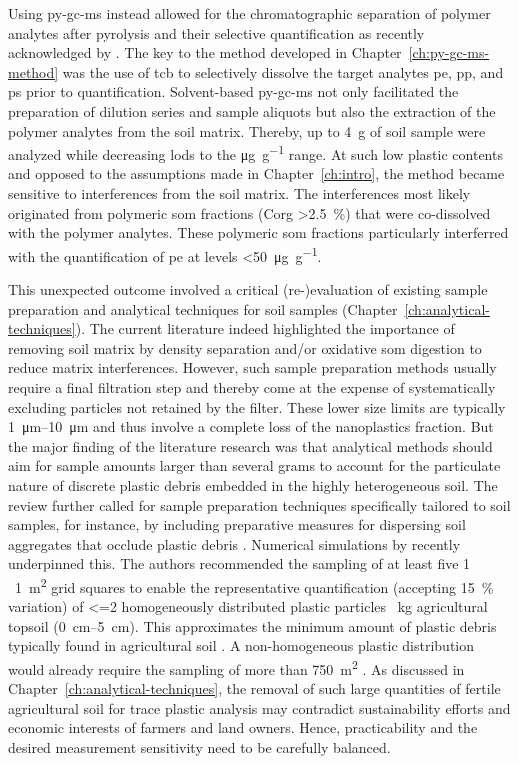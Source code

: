 Using \ac{py-gc-ms} instead allowed for the chromatographic separation of polymer analytes after pyrolysis and their selective quantification as recently acknowledged by \citet{Jimenez-SkrzypekCurrent2021}. The key to the method developed in Chapter~\ref{ch:py-gc-ms-method} was the use of \ac{tcb} to selectively dissolve the target analytes \ac{pe}, \ac{pp}, and \ac{ps} prior to quantification. Solvent-based \ac{py-gc-ms} not only facilitated the preparation of dilution series and sample aliquots but also the extraction of the polymer analytes from the soil matrix. Thereby, up to \SI{4}{\gram} of soil sample were analyzed while decreasing \acp{lod} to the \si{\micro\gram\per\gram} range.
At such low plastic contents and opposed to the assumptions made in Chapter~\ref{ch:intro}, the method became sensitive to interferences from the soil matrix. The interferences most likely originated from polymeric \ac{som} fractions (\ac{Corg} \SI{>2.5}{\percent}) that were co-dissolved with the polymer analytes. These polymeric \ac{som} fractions particularly interferred with the quantification of \ac{pe} at levels \SI{<50}{\micro\gram\per\gram}.

This unexpected outcome involved a critical (re-)evaluation of existing sample preparation and analytical techniques for soil samples (Chapter~\ref{ch:analytical-techniques}). The current literature indeed highlighted the importance of removing soil matrix by density separation and/or oxidative \ac{som} digestion to reduce matrix interferences. However, such sample preparation methods usually require a final filtration step and thereby come at the expense of systematically excluding particles not retained by the filter. These lower size limits are typically \SIrange{1}{10}{\micro\meter} and thus involve a complete loss of the nanoplastics fraction.
But the major finding of the literature research was that analytical methods should aim for sample amounts larger than several grams to account for the particulate nature of discrete plastic debris embedded in the highly heterogeneous soil. The review further called for sample preparation techniques specifically tailored to soil samples, for instance, by including preparative measures for dispersing soil aggregates that occlude plastic debris \citep{ZhangDistribution2018}. Numerical simulations by \citet{YuHow2021} recently underpinned this. The authors recommended the sampling of at least five 1 \texttimes\ \SI{1}{\square\meter} grid squares to enable the representative quantification (accepting \SI{15}{\percent} variation) of \num{<=2} homogeneously distributed plastic particles \si{\per\kilo\gram} agricultural topsoil (\SIrange{0}{5}{\centi\meter}). This approximates the minimum amount of plastic debris typically found in agricultural soil \citep{BuksGlobal2020}. A non-homogeneous plastic distribution would already require the sampling of more than \SI{750}{\square\meter} \citep{YuHow2021}. As discussed in Chapter~\ref{ch:analytical-techniques}, the removal of such large quantities of fertile agricultural soil for trace plastic analysis may contradict sustainability efforts and economic interests of farmers and land owners. Hence, practicability and the desired measurement sensitivity need to be carefully balanced.

